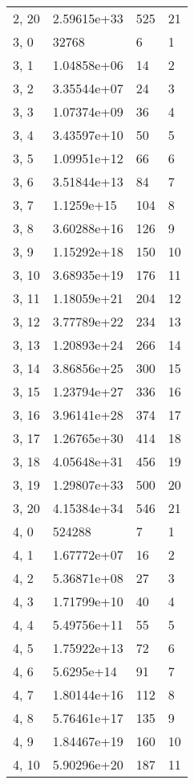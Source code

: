\begin{table}
\begin{tabular}{llll}
2, 20  &  2.59615e+33 &  525 &    21 \\
3, 0   &        32768 &    6 &     1 \\
3, 1   &  1.04858e+06 &   14 &     2 \\
3, 2   &  3.35544e+07 &   24 &     3 \\
3, 3   &  1.07374e+09 &   36 &     4 \\
3, 4   &  3.43597e+10 &   50 &     5 \\
3, 5   &  1.09951e+12 &   66 &     6 \\
3, 6   &  3.51844e+13 &   84 &     7 \\
3, 7   &   1.1259e+15 &  104 &     8 \\
3, 8   &  3.60288e+16 &  126 &     9 \\
3, 9   &  1.15292e+18 &  150 &    10 \\
3, 10  &  3.68935e+19 &  176 &    11 \\
3, 11  &  1.18059e+21 &  204 &    12 \\
3, 12  &  3.77789e+22 &  234 &    13 \\
3, 13  &  1.20893e+24 &  266 &    14 \\
3, 14  &  3.86856e+25 &  300 &    15 \\
3, 15  &  1.23794e+27 &  336 &    16 \\
3, 16  &  3.96141e+28 &  374 &    17 \\
3, 17  &  1.26765e+30 &  414 &    18 \\
3, 18  &  4.05648e+31 &  456 &    19 \\
3, 19  &  1.29807e+33 &  500 &    20 \\
3, 20  &  4.15384e+34 &  546 &    21 \\
4, 0   &       524288 &    7 &     1 \\
4, 1   &  1.67772e+07 &   16 &     2 \\
4, 2   &  5.36871e+08 &   27 &     3 \\
4, 3   &  1.71799e+10 &   40 &     4 \\
4, 4   &  5.49756e+11 &   55 &     5 \\
4, 5   &  1.75922e+13 &   72 &     6 \\
4, 6   &   5.6295e+14 &   91 &     7 \\
4, 7   &  1.80144e+16 &  112 &     8 \\
4, 8   &  5.76461e+17 &  135 &     9 \\
4, 9   &  1.84467e+19 &  160 &    10 \\
4, 10  &  5.90296e+20 &  187 &    11 \\

\end{tabular}
\end{table}
